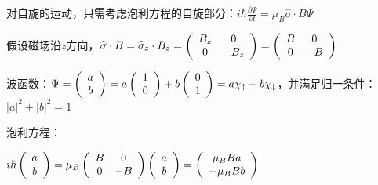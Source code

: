 对自旋的运动，只需考虑泡利方程的自旋部分：$i\hbar \frac{{\partial \Psi }}{{\partial t}} = \mu _B \widehat\sigma  \cdot B\Psi $


假设磁场沿$z$方向，$\widehat\sigma  \cdot B = \widehat\sigma _z  \cdot B_z  = \left( {\begin{array}{*{20}c}
   {B_z } & 0  \\
   0 & { - B_z }  \\
\end{array}} \right) = \left( {\begin{array}{*{20}c}
   B & 0  \\
   0 & { - B}  \\
\end{array}} \right)$

波函数：$\Psi  = \left( {\begin{array}{*{20}c}
   a  \\
   b  \\
\end{array}} \right) = a\left( {\begin{array}{*{20}c}
   1  \\
   0  \\
\end{array}} \right) + b\left( {\begin{array}{*{20}c}
   0  \\
   1  \\
\end{array}} \right) = a\chi _ \uparrow   + b\chi _ \downarrow  $，并满足归一条件：$\left| a \right|^2  + \left| b \right|^2  = 1$


泡利方程：

$i\hbar \left( {\begin{array}{*{20}c}
   {\dot a}  \\
   {\dot b}  \\
\end{array}} \right) = \mu _B \left( {\begin{array}{*{20}c}
   B & 0  \\
   0 & { - B}  \\
\end{array}} \right)\left( {\begin{array}{*{20}c}
   a  \\
   b  \\
\end{array}} \right) =
\left( {\begin{array}{*{20}c}
   {\mu _B Ba}   \\
   { - \mu _B Bb}  \\
\end{array}} \right)$


